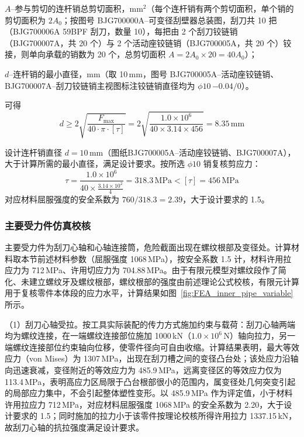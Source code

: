 $A$--参与剪切的连杆销总剪切面积，mm$^2$（每个连杆销有两个剪切面积，单个销的剪切面积为 $2A_0$；按图号 BJG700000A--可变径刮壁器总装图，刮刀共 10 把（BJG700006A 59BPF 刮刀，数量 10），每把由 2 个刮刀铰链销（BJG700007A，共 20 个）与 2 个活动座铰链销（BJG700005A，共 20 个）铰接，则单向承载的销数为 20 个，总剪切面积 $A = 2A_0 \times 20 = 40A_0$）；

$d$--连杆销的最小直径，mm（取 10\,mm，图号 BJG700005A--活动座铰链销、BJG700007A--刮刀铰链销主视图标注铰链销直径均为 $\phi 10\,{-0.04}/0$）。

可得
\begin{equation}
    d \ge 2\sqrt{\frac{F_{\max}}{40 \cdot \pi \cdot [\tau]}} = 2\sqrt{\frac{1.0 \times 10^{6}}{40 \times 3.14 \times 456}} = 8.35\,\mathrm{mm}
\end{equation}

设计连杆销直径 $d = 10\,\mathrm{mm}$（图纸BJG700005A--活动座铰链销、BJG700007A），大于计算所需的最小直径，满足设计要求。按所选 $\phi 10$ 销复核剪应力：
\begin{equation}
    \tau = \frac{1.0 \times 10^{6}}{40 \times \frac{3.14 \times 10^{2}}{4}} = 318.3\,\mathrm{MPa} < [\tau] = 456\,\mathrm{MPa}
\end{equation}
对应材料屈服强度的安全系数为 $760/318.3 = 2.39$，大于设计要求的 1.5。


\subsubsection{主要受力件仿真校核}\label{sec:fea-var}

主要受力件为刮刀心轴和心轴连接筒，危险截面出现在螺纹根部及变径处。计算材料取本节前述材料参数（屈服强度 1068\,MPa），按安全系数 1.5 计，材料许用拉应力为 712\,MPa、许用切应力为 704.88\,MPa。由于有限元模型对螺纹段作了简化、未建立螺纹牙及螺纹根部，螺纹根部的强度由前述理论公式校核，有限元计算用于复核零件本体段的应力水平，计算结果如图~\ref{fig:FEA_inner_pipe_variable}所示。

（1）刮刀心轴受拉。按工具实际装配的传力方式施加约束与载荷：刮刀心轴两端均为螺纹连接，在一端螺纹连接部位施加 1000\,kN（\(1.0\times10^{6}\)\,N）轴向拉力，另一端螺纹连接部位约束轴向位移，使零件径向可自由收缩。计算结果表明，最大等效应力（von Mises）为 1307\,MPa，出现在刮刀槽之间的变径凸台处；该处应力沿轴向迅速衰减，变径附近的等效应力为 485.9\,MPa，远离变径区的等效应力仅为 113.4\,MPa，表明高应力区局限于凸台根部很小的范围内，属变径处几何突变引起的局部应力集中，不会引起整体塑性变形。以 485.9\,MPa 作为评定值，小于材料许用拉应力 712\,MPa，对应材料屈服强度 1068\,MPa 的安全系数为 2.20，大于设计要求的 1.5；同时施加的拉力小于该零件按理论校核所得许用拉力 1337.15\,kN，故刮刀心轴的抗拉强度满足设计要求。

